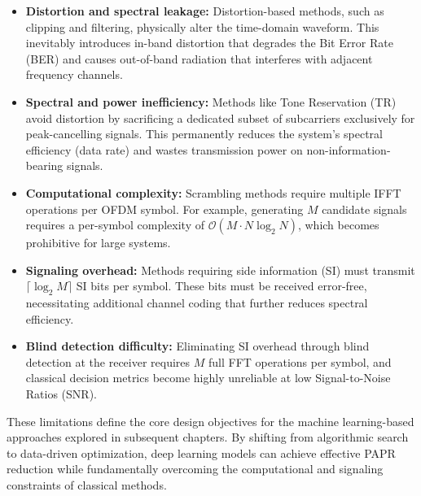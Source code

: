 \begin{itemize}
    \item \textbf{Distortion and spectral leakage:} Distortion-based methods, such as clipping and filtering, physically alter the time-domain waveform. This inevitably introduces in-band distortion that degrades the Bit Error Rate (BER) and causes out-of-band radiation that interferes with adjacent frequency channels.
    \item \textbf{Spectral and power inefficiency:} Methods like Tone Reservation (TR) avoid distortion by sacrificing a dedicated subset of subcarriers exclusively for peak-cancelling signals. This permanently reduces the system's spectral efficiency (data rate) and wastes transmission power on non-information-bearing signals.
    \item \textbf{Computational complexity:} Scrambling methods require multiple IFFT operations per OFDM symbol. For example, generating $M$ candidate signals requires a per-symbol complexity of $\mathcal{O}(M \cdot N\log_2 N)$, which becomes prohibitive for large systems.
    \item \textbf{Signaling overhead:} Methods requiring side information (SI) must transmit $\lceil\log_2 M\rceil$ SI bits per symbol. These bits must be received error-free, necessitating additional channel coding that further reduces spectral efficiency.
    \item \textbf{Blind detection difficulty:} Eliminating SI overhead through blind detection at the receiver requires $M$ full FFT operations per symbol, and classical decision metrics become highly unreliable at low Signal-to-Noise Ratios (SNR).
\end{itemize}

These limitations define the core design objectives for the machine learning-based approaches explored in subsequent chapters. By shifting from algorithmic search to data-driven optimization, deep learning models can achieve effective PAPR reduction while fundamentally overcoming the computational and signaling constraints of classical methods.
